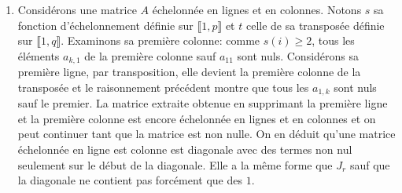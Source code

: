 \begin{enumerate}
  \item Considérons une matrice $A$ échelonnée en lignes et en colonnes. Notons $s$ sa fonction d'échelonnement définie sur $\llbracket 1,p\rrbracket$ et $t$ celle de sa transposée définie sur $\llbracket 1, q\rrbracket$. Examinons sa première colonne: comme $s(i)\geq 2$, tous les éléments $a_{k,1}$ de la première colonne sauf $a_{1 1}$ sont nuls. Considérons sa première ligne, par transposition, elle devient la première colonne de la transposée et le raisonnement précédent montre que tous les $a_{1,k}$ sont nuls sauf le premier.\newline
  La matrice extraite obtenue en supprimant la première ligne et la première colonne est encore échelonnée en lignes et en colonnes et on peut continuer tant que la matrice est non nulle. On en déduit qu'une matrice échelonnée en ligne est colonne est diagonale avec des termes non nul seulement sur le début de la diagonale. Elle a la même forme que $J_r$ sauf que la diagonale ne contient pas forcément que des $1$.

\end{enumerate}
